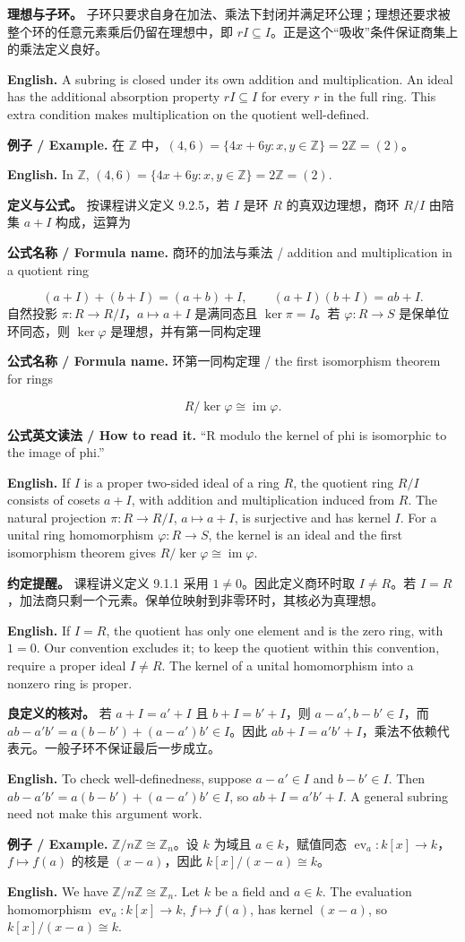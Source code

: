 \documentclass[UTF8,11pt,a4paper]{ctexart}
\newcommand{\EN}[1]{\par\noindent\textbf{English.} #1\par}
\newcommand{\READ}[1]{\par\noindent\textbf{公式英文读法 / How to read it.} #1\par}
\newcommand{\FORMULA}[2]{\par\noindent\textbf{公式名称 / Formula name.} #1 / #2\par}
\newcommand{\EX}[2]{\par\noindent\textbf{例子 / Example.} #1\par\EN{#2}}
\begin{document}
\noindent\textbf{理想与子环。} 子环只要求自身在加法、乘法下封闭并满足环公理；理想还要求被整个环的任意元素乘后仍留在理想中，即 $rI\subseteq I$。正是这个“吸收”条件保证商集上的乘法定义良好。
\EN{A subring is closed under its own addition and multiplication. An ideal has the additional absorption property $rI\subseteq I$ for every $r$ in the full ring. This extra condition makes multiplication on the quotient well-defined.}

\EX{在 $\mathbb Z$ 中，$(4,6)=\{4x+6y:x,y\in\mathbb Z\}=2\mathbb Z=(2)$。}{In $\mathbb Z$, $(4,6)=\{4x+6y:x,y\in\mathbb Z\}=2\mathbb Z=(2)$.}

\noindent\textbf{定义与公式。} 按课程讲义定义 9.2.5，若 $I$ 是环 $R$ 的真双边理想，商环 $R/I$ 由陪集 $a+I$ 构成，运算为
\FORMULA{商环的加法与乘法}{addition and multiplication in a quotient ring}
\[
(a+I)+(b+I)=(a+b)+I,\qquad (a+I)(b+I)=ab+I.
\]
自然投影 $\pi:R\to R/I$，$a\mapsto a+I$ 是满同态且 $\ker\pi=I$。若 $\varphi:R\to S$ 是保单位环同态，则 $\ker\varphi$ 是理想，并有第一同构定理
\FORMULA{环第一同构定理}{the first isomorphism theorem for rings}
\[
R/\ker\varphi\cong\operatorname{im}\varphi.
\]
\READ{“R modulo the kernel of phi is isomorphic to the image of phi.”}
\EN{If $I$ is a proper two-sided ideal of a ring $R$, the quotient ring $R/I$ consists of cosets $a+I$, with addition and multiplication induced from $R$. The natural projection $\pi:R\to R/I$, $a\mapsto a+I$, is surjective and has kernel $I$. For a unital ring homomorphism $\varphi:R\to S$, the kernel is an ideal and the first isomorphism theorem gives $R/\ker\varphi\cong\operatorname{im}\varphi$.}

\noindent \textbf{约定提醒。} 课程讲义定义 9.1.1 采用 $1\ne0$。因此定义商环时取 $I\ne R$。若 $I=R$，加法商只剩一个元素。保单位映射到非零环时，其核必为真理想。
\EN{If $I=R$, the quotient has only one element and is the zero ring, with $1=0$. Our convention excludes it; to keep the quotient within this convention, require a proper ideal $I\ne R$. The kernel of a unital homomorphism into a nonzero ring is proper.}

\noindent\textbf{良定义的核对。} 若 $a+I=a'+I$ 且 $b+I=b'+I$，则 $a-a',b-b'\in I$，而
$ab-a'b'=a(b-b')+(a-a')b'\in I$。因此 $ab+I=a'b'+I$，乘法不依赖代表元。一般子环不保证最后一步成立。
\EN{To check well-definedness, suppose $a-a'\in I$ and $b-b'\in I$. Then $ab-a'b'=a(b-b')+(a-a')b'\in I$, so $ab+I=a'b'+I$. A general subring need not make this argument work.}

\EX{$\mathbb Z/n\mathbb Z\cong\mathbb Z_n$。设 $k$ 为域且 $a\in k$，赋值同态 $\operatorname{ev}_a:k[x]\to k$，$f\mapsto f(a)$ 的核是 $(x-a)$，因此 $k[x]/(x-a)\cong k$。}{We have $\mathbb Z/n\mathbb Z\cong\mathbb Z_n$. Let $k$ be a field and $a\in k$. The evaluation homomorphism $\operatorname{ev}_a:k[x]\to k$, $f\mapsto f(a)$, has kernel $(x-a)$, so $k[x]/(x-a)\cong k$.}
\end{document}
